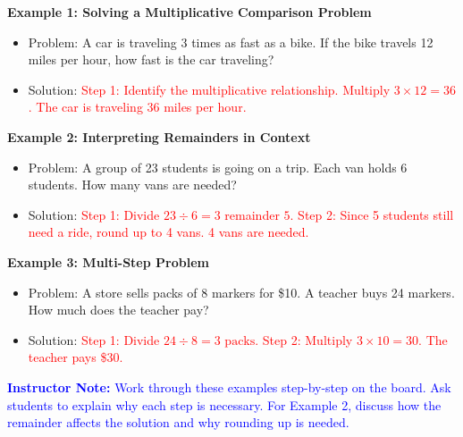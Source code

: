 \documentclass[12pt]{article}
\begin{document}
\begin{tcolorbox}[colframe=black!60, colback=white, 
coltitle=black, colbacktitle=black!15, fonttitle=\bfseries\Large, 
title=Examples, halign title=center, left=10pt, right=10pt, top=10pt, bottom=15pt]
\textbf{Example 1: Solving a Multiplicative Comparison Problem}
\begin{itemize}
    \item Problem: A car is traveling 3 times as fast as a bike. If the bike travels 12 miles per hour, how fast is the car traveling?
    \item Solution: \textcolor{red}{Step 1: Identify the multiplicative relationship. Multiply \( 3 \times 12 = 36 \). The car is traveling 36 miles per hour.}
\end{itemize}

\textbf{Example 2: Interpreting Remainders in Context}
\begin{itemize}
    \item Problem: A group of 23 students is going on a trip. Each van holds 6 students. How many vans are needed?
    \item Solution: \textcolor{red}{Step 1: Divide \( 23 \div 6 = 3 \) remainder \( 5 \). Step 2: Since 5 students still need a ride, round up to 4 vans. 4 vans are needed.}
\end{itemize}

\textbf{Example 3: Multi-Step Problem}
\begin{itemize}
    \item Problem: A store sells packs of 8 markers for \$10. A teacher buys 24 markers. How much does the teacher pay?
    \item Solution: \textcolor{red}{Step 1: Divide \( 24 \div 8 = 3 \text{ packs.} \) Step 2: Multiply \( 3 \times 10 = 30 \). The teacher pays \$30.}
\end{itemize}

\textcolor{blue}{\textbf{Instructor Note:} Work through these examples step-by-step on the board. Ask students to explain why each step is necessary. For Example 2, discuss how the remainder affects the solution and why rounding up is needed.}
\end{tcolorbox}
\end{document}
